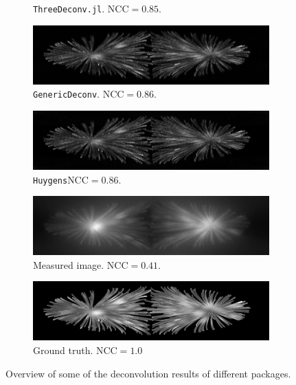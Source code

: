 \documentclass{juliacon}
\begin{document}
\begin{figure}[h]
\begin{subfigure}{.3\textwidth}
                \caption{\texttt{ThreeDeconv.jl}. $\text{NCC}= 0.85$.}
            \end{subfigure}
            \begin{subfigure}{.3\textwidth}
                \centering
                \includegraphics[width=\textwidth]{figures/MIPs/mip_GenericDeconv.png}
                \caption{\texttt{GenericDeconv}. $\text{NCC}= 0.86$.}
            \end{subfigure}
            \begin{subfigure}{.3\textwidth}
                \centering
                \includegraphics[width=\textwidth]{figures/MIPs/mip_Huygens.png}
                \caption{\texttt{Huygens}$\text{NCC}= 0.86$.}
            \end{subfigure}
            \begin{subfigure}{.3\textwidth}
                \centering
                \includegraphics[width=\textwidth]{figures/MIPs/mip_raw.png}
                \caption{Measured image. $\text{NCC}= 0.41$.}
            \end{subfigure}
            \begin{subfigure}{.3\textwidth}
                \centering
                \includegraphics[width=\textwidth]{figures/MIPs/mip_ground_truth.png}
                \caption{Ground truth. $\text{NCC}= 1.0$}
            \end{subfigure}
            \caption{Overview of some of the deconvolution results of different packages.}
            \label{img:results}
        \end{figure} 
\end{document}
